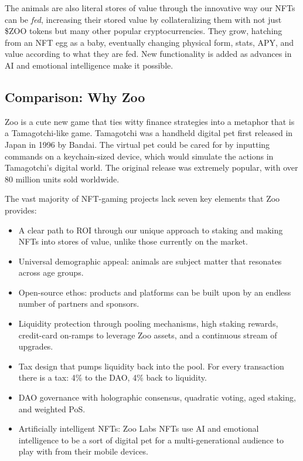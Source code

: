 The animals are also literal stores of value through the innovative way our NFTs can be \emph{fed}, increasing their stored value by collateralizing them with not just \$ZOO tokens but many other popular cryptocurrencies. They grow, hatching from an NFT egg as a baby, eventually changing physical form, stats, APY, and value according to what they are fed. New functionality is added as advances in AI and emotional intelligence make it possible.

\subsection{Comparison: Why Zoo}

Zoo is a cute new game that ties witty finance strategies into a metaphor that is a Tamagotchi-like game. Tamagotchi was a handheld digital pet first released in Japan in 1996 by Bandai. The virtual pet could be cared for by inputting commands on a keychain-sized device, which would simulate the actions in Tamagotchi's digital world. The original release was extremely popular, with over 80 million units sold worldwide.

The vast majority of NFT-gaming projects lack seven key elements that Zoo provides:

\begin{itemize}
  \item A clear path to ROI through our unique approach to staking and making NFTs into stores of value, unlike those currently on the market.
  \item Universal demographic appeal: animals are subject matter that resonates across age groups.
  \item Open-source ethos: products and platforms can be built upon by an endless number of partners and sponsors.
  \item Liquidity protection through pooling mechanisms, high staking rewards, credit-card on-ramps to leverage Zoo assets, and a continuous stream of upgrades.
  \item Tax design that pumps liquidity back into the pool. For every transaction there is a tax: 4\% to the DAO, 4\% back to liquidity.
  \item DAO governance with holographic consensus, quadratic voting, aged staking, and weighted PoS.
  \item Artificially intelligent NFTs: Zoo Labs NFTs use AI and emotional intelligence to be a sort of digital pet for a multi-generational audience to play with from their mobile devices.
\end{itemize}
